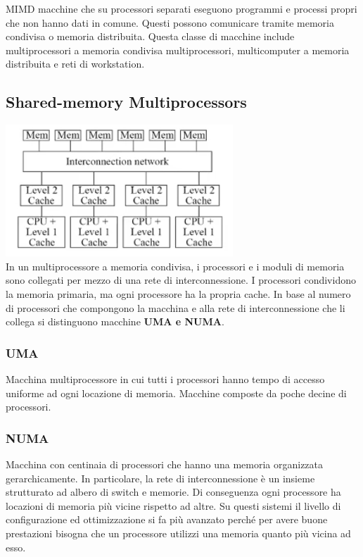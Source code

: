 \documentclass[10pt,a4paper]{article}
\begin{document}
MIMD macchine che su processori separati eseguono programmi e processi propri che non hanno dati in comune. Questi possono comunicare tramite memoria condivisa o memoria distribuita.
Questa classe di macchine include multiprocessori a memoria condivisa multiprocessori, multicomputer a memoria distribuita e reti di workstation.

\subsection{Shared-memory Multiprocessors}
\includegraphics[scale=1]{img/sharedmem.png} \\
In un multiprocessore a memoria condivisa, i processori e i moduli di memoria sono collegati per mezzo di una rete di interconnessione. I processori condividono la memoria primaria, ma ogni processore ha la propria cache.
In base al numero di processori che compongono la macchina e alla rete di interconnessione che li collega si distinguono macchine \textbf{UMA e NUMA}.
\subsubsection{UMA} Macchina multiprocessore in cui tutti i processori hanno tempo di accesso uniforme ad ogni locazione di memoria.
Macchine composte da poche decine di processori.
\subsubsection{NUMA} Macchina con centinaia di processori che hanno una memoria organizzata gerarchicamente. In particolare, la rete di interconnessione è un insieme strutturato ad albero di switch e memorie. Di conseguenza ogni processore ha locazioni di memoria più vicine rispetto ad altre. Su questi sistemi il livello di configurazione ed ottimizzazione si fa più avanzato perché per avere buone prestazioni bisogna che un processore utilizzi una memoria quanto più vicina ad esso.
\end{document}

